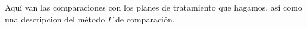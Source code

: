 Aquí van las comparaciones con los planes de tratamiento que hagamos, así como una descripcion del método $\Gamma$ de comparación.
